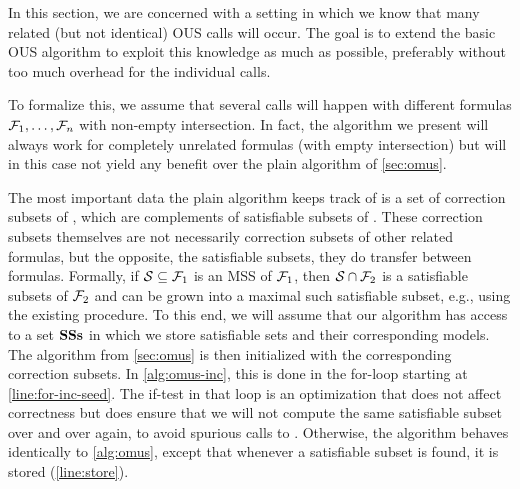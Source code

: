 In this section, we are concerned with a setting in which we know that many related (but not identical) OUS calls will occur. The goal is to extend the basic OUS algorithm to exploit this knowledge as much as possible, preferably without too much overhead for the individual calls. 

\newcommand\satsets{\mm{\mathbf{SSs}}}
\newcommand\fall{\mm{\formula_{\mathit{all}}}}
To formalize this, we assume that several \omus calls will happen with different formulas $\mathcal{F} _1,\dots,\mathcal{F} _n$ with non-empty intersection. In fact, the algorithm we present will always work for completely unrelated formulas (with empty intersection) but will in this case not yield any benefit over the plain \omus algorithm of \cref{sec:omus}. 

The most important data the plain \omus algorithm keeps track of is a set of correction subsets of \formula, which are complements of satisfiable subsets of \formula.
These correction subsets themselves are not necessarily correction subsets of other related formulas, but the opposite, the satisfiable subsets, they do transfer between formulas. Formally, if $\mathcal{S} \subseteq \mathcal{F} _1$ is an MSS of $\mathcal{F} _1$, then $\mathcal{S}\cap \mathcal{F} _2$ is a satisfiable subsets of $\mathcal{F} _2$ and can be grown into a maximal such satisfiable subset, e.g., using the existing \grow procedure. 
To this end, we will assume that our algorithm has access to a set $\satsets$ in which we store satisfiable sets and their corresponding models. The \omus algorithm from \cref{sec:omus} is then initialized with the corresponding correction subsets. 
In  \cref{alg:omus-inc}, this is done in the for-loop starting at \cref{line:for-inc-seed}. The if-test in that loop is an optimization that does not affect correctness but does ensure that we will not compute the same satisfiable subset over and over again, to avoid spurious calls to \grow. 
Otherwise, the algorithm behaves identically to \cref{alg:omus}, except that whenever a satisfiable subset is found, it is stored (\cref{line:store}). 
 


